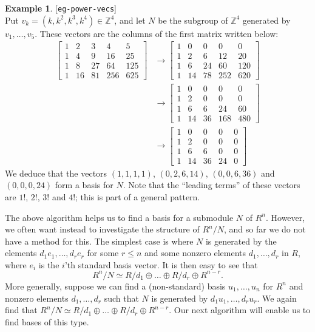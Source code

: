 \documentclass{amsart}
\newcommand{\lbl}[1]{\label{#1}\textup{[\texttt{#1}]}\ \\}
\newcommand{\lbl}{\label}
\newcommand{\bbm}       {\left[\begin{matrix}}
\newcommand{\ebm}       {\end{matrix}\right]}
\newcommand{\Z}         {{\mathbb{Z}}}
\newcommand{\xra}       {\xrightarrow}
\newcommand{\op}        {\oplus}
\renewcommand{\:}{\colon}
\theoremstyle{definition}
\newtheorem{example}[theorem]{Example}
\begin{document}
\begin{example}\lbl{eg-power-vecs}
 Put $v_k=(k,k^2,k^3,k^4)\in\Z^4$, and let $N$ be the subgroup of
 $\Z^4$ generated by $v_1,\ldots,v_5$.  These vectors are the columns
 of the first matrix written below:
 \begin{align*}
  \bbm 1&2&3&4&5\\
       1&4&9&16&25\\
       1&8&27&64&125\\
       1&16&81&256&625
  \ebm
 &\xra{} 
  \bbm 1&0&0&0&0\\
       1&2&6&12&20\\
       1&6&24&60&120\\
       1&14&78&252&620
  \ebm \\
 &\xra{} 
  \bbm 1&0&0&0&0\\
       1&2&0&0&0\\
       1&6&6&24&60\\
       1&14&36&168&480
  \ebm \\
 &\xra{}
  \bbm 1&0&0&0&0\\
       1&2&0&0&0\\
       1&6&6&0&0\\
       1&14&36&24&0
  \ebm
 \end{align*}
 We deduce that the vectors $(1,1,1,1)$, $(0,2,6,14)$, $(0,0,6,36)$
 and $(0,0,0,24)$ form a basis for $N$.  Note that the ``leading
 terms'' of these vectors are $1!$, $2!$, $3!$ and $4!$; this is part
 of a general pattern.
\end{example}

The above algorithm helps us to find a basis for a submodule $N$ of
$R^n$.  However, we often want instead to investigate the structure of
$R^n/N$, and so far we do not have a method for this.  The simplest
case is where $N$ is generated by the elements $d_1e_1,\ldots,d_re_r$
for some $r\leq n$ and some nonzero elements $d_1,\ldots,d_r$ in $R$,
where $e_i$ is the $i$'th standard basis vector.  It is then easy to
see that
\[ R^n/N \simeq R/d_1\op\ldots\op R/d_r\op R^{n-r}. \]
More generally, suppose we can find a (non-standard) basis
$u_1,\ldots,u_n$ for $R^n$ and nonzero elements $d_1,\ldots,d_r$ such
that $N$ is generated by $d_1u_1,\ldots,d_ru_r$.  We again find that
$R^n/N\simeq R/d_1\op\ldots\op R/d_r\op R^{n-r}$.  Our next algorithm
will enable us to find bases of this type.
\end{document}
